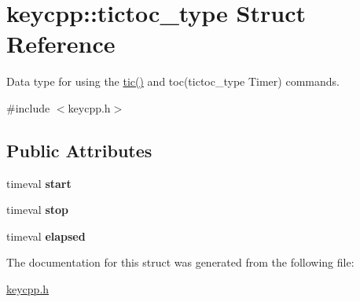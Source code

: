 \hypertarget{structkeycpp_1_1tictoc__type}{\section{keycpp\-:\-:tictoc\-\_\-type Struct Reference}
\label{structkeycpp_1_1tictoc__type}
}


Data type for using the \hyperlink{namespacekeycpp_a6069a9eec0edfa1d401230013d98765e}{tic()} and toc(tictoc\-\_\-type Timer) commands.  




{\ttfamily \#include $<$keycpp.\-h$>$}

\subsection*{Public Attributes}
\begin{DoxyCompactItemize}
\item 
\hypertarget{structkeycpp_1_1tictoc__type_ad6878570bb9710bf65574d2296ebd287}{timeval {\bfseries start}}\label{structkeycpp_1_1tictoc__type_ad6878570bb9710bf65574d2296ebd287}

\item 
\hypertarget{structkeycpp_1_1tictoc__type_a4d57057ccd64987a00d47be2eeda40a5}{timeval {\bfseries stop}}\label{structkeycpp_1_1tictoc__type_a4d57057ccd64987a00d47be2eeda40a5}

\item 
\hypertarget{structkeycpp_1_1tictoc__type_aceaa45496add0b4c6714ac69e98c2580}{timeval {\bfseries elapsed}}\label{structkeycpp_1_1tictoc__type_aceaa45496add0b4c6714ac69e98c2580}

\end{DoxyCompactItemize}


The documentation for this struct was generated from the following file\-:\begin{DoxyCompactItemize}
\item 
\hyperlink{keycpp_8h}{keycpp.\-h}\end{DoxyCompactItemize}
